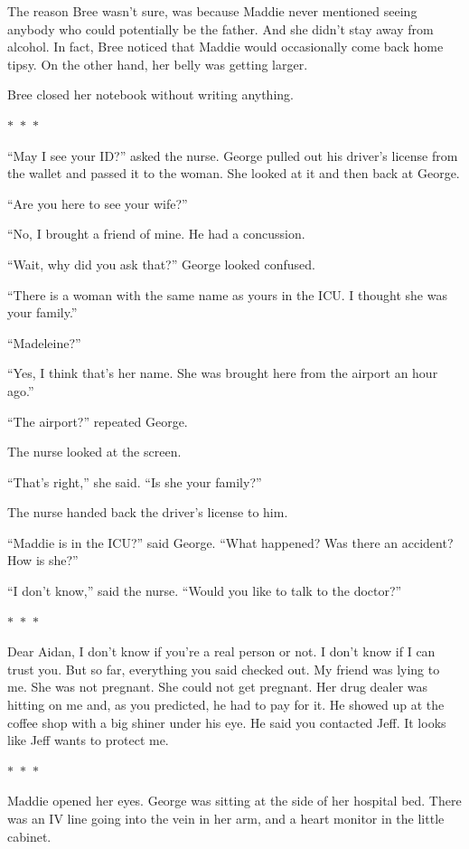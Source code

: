 \documentclass{memoir}
\newcommand{\starbreak}{%
\begin{center}
  $\ast$~$\ast$~$\ast$
\end{center}
}
\begin{document}
The reason Bree wasn't sure, was because Maddie never mentioned seeing anybody who could potentially be the father. And she didn't stay away from alcohol. In fact, Bree noticed that Maddie would occasionally come back home tipsy. On the other hand, her belly was getting larger. 

Bree closed her notebook without writing anything.

\starbreak

``May I see your ID?'' asked the nurse.
George pulled out his driver's license from the wallet and passed it to the woman. She looked at it and then back at George.

``Are you here to see your wife?''

``No, I brought a friend of mine. He had a concussion.

``Wait, why did you ask that?'' George looked confused. 

``There is a woman with the same name as yours in the ICU. I thought she was your family.''

``Madeleine?''

``Yes, I think that's her name. She was brought here from the airport an hour ago.'' 

``The airport?'' repeated George.

The nurse looked at the screen. 

``That's right,'' she said. ``Is she your family?''

The nurse handed back the driver's license to him.

``Maddie is in the ICU?'' said George. ``What happened? Was there an accident? How is she?''

``I don't know,'' said the nurse. ``Would you like to talk to the doctor?''

\starbreak

Dear Aidan,
I don't know if you're a real person or not. I don't know if I can trust you. But so far, everything you said checked out. My friend was lying to me. She was not pregnant. She could not get pregnant. Her drug dealer was hitting on me and, as you predicted, he had to pay for it. He showed up at the coffee shop with a big shiner under his eye. He said you contacted Jeff. It looks like Jeff wants to protect me.

\starbreak

Maddie opened her eyes. George was sitting at the side of her hospital bed. There was an IV line going into the vein in her arm, and a heart monitor in the little cabinet.
\end{document}
